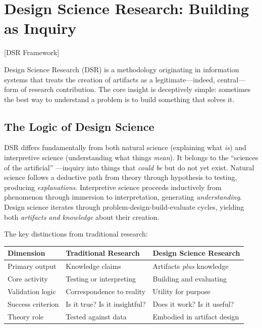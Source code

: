 \documentclass[../main.tex]{subfiles}
\begin{document}
\section{Design Science Research: Building as Inquiry}[DSR Framework]

Design Science Research (DSR) is a methodology originating in information systems that treats the creation of artifacts as a legitimate---indeed, central---form of research contribution. The core insight is deceptively simple: sometimes the best way to understand a problem is to build something that solves it.

\subsection{The Logic of Design Science}

DSR differs fundamentally from both natural science (explaining what \emph{is}) and interpretive science (understanding what things \emph{mean}). It belongs to the ``sciences of the artificial'' \cite{simon1996sciences}---inquiry into things that \emph{could be} but do not yet exist. Natural science follows a deductive path from theory through hypothesis to testing, producing \emph{explanations}. Interpretive science proceeds inductively from phenomenon through immersion to interpretation, generating \emph{understanding}. Design science iterates through problem-design-build-evaluate cycles, yielding both \emph{artifacts and knowledge} about their creation.

The key distinctions from traditional research:

\tableminimal
\small
\begin{center}
\begin{tabular}{@{}p{3.5cm}p{3.5cm}p{3.5cm}@{}}
\toprule
\textbf{Dimension} & \textbf{Traditional Research} & \textbf{Design Science Research} \\
\midrule
Primary output & Knowledge claims & Artifacts \emph{plus} knowledge \\
Core activity & Testing or interpreting & Building and evaluating \\
Validation logic & Correspondence to reality & Utility for purpose \\
Success criterion & Is it true? Is it insightful? & Does it work? Is it useful? \\
Theory role & Tested against data & Embodied in artifact design \\
\bottomrule
\end{tabular}
\end{center}
\normalsize
\end{document}
